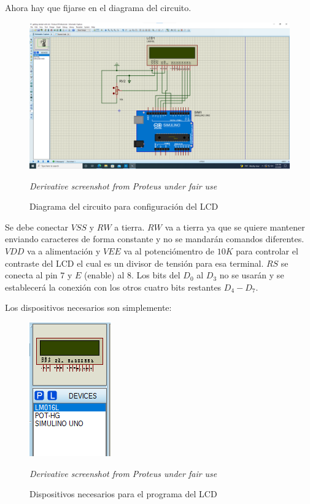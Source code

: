 \documentclass{article}
\begin{document}
    \bigbreak

    Ahora hay que fijarse en el diagrama del circuito.

    \begin{figure}[H]
        \centering
        \includegraphics[width=0.6\paperwidth]{images/sim-schematic.png}
        \caption{Diagrama del circuito para configuración del LCD}\footnotesize
        \textit{Derivative screenshot from Proteus under fair use}
    \end{figure}

    Se debe conectar $VSS$ y $RW$ a tierra. $RW$ va a tierra ya que se quiere
    mantener enviando caracteres de forma constante y no se mandarán comandos
    diferentes. $VDD$ va a alimentación y $VEE$ va al potenciómentro de $10K$
    para controlar el contraste del LCD el cual es un divisor de tensión para
    esa terminal. $RS$ se conecta al pin $7$ y $E$ (enable) al $8$. Los bits
    del $D_0$ al $D_3$ no se usarán y se establecerá la conexión con los
    otros cuatro bits restantes $D_4-D_7$.

    \bigbreak

    Los dispositivos necesarios son simplemente:

    \begin{figure}[H]
        \centering
        \includegraphics[width=0.2\paperwidth]{images/sim-devices.png}
        \caption{Dispositivos necesarios para el programa del LCD}\footnotesize
        \textit{Derivative screenshot from Proteus under fair use}
    \end{figure}
\end{document}
